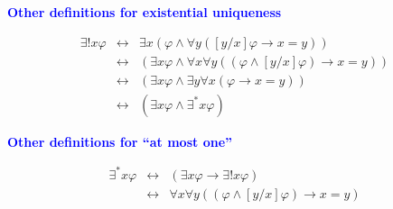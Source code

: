 \documentclass{slides}
\begin{document}
\begin{slide}

\begin{center}
\textcolor{blue}{\textbf{Other definitions
 for existential uniqueness}}
\end{center}
\begin{eqnarray}
  \exists{!} x \varphi
        & \leftrightarrow & \exists x ( \varphi \wedge
\forall y ( [ y / x ] \varphi \rightarrow x = y ) ) \label{eu1} \\
        & \leftrightarrow & ( \exists x \varphi \wedge
\forall x \forall y ( ( \varphi \wedge [ y / x ] \varphi ) \rightarrow x = y )
)  \label{eu2}  \\
        & \leftrightarrow & ( \exists x \varphi \wedge
\exists y \forall x ( \varphi \rightarrow x = y ) ) \label{eu3} \\
        & \leftrightarrow & ( \exists x \varphi \wedge
\exists^\ast x \varphi ) \label{eu5}
\end{eqnarray}

\begin{center}
\textcolor{blue}{\textbf{Other definitions for ``at most one''}}
\end{center}
\begin{eqnarray}
\exists^\ast x \varphi & \leftrightarrow & ( \exists x \varphi \rightarrow
\exists{!} x \varphi ) \label{df-mo} \\
        & \leftrightarrow & \forall x \forall y ( ( \varphi
\wedge [ y / x ] \varphi ) \rightarrow x = y )  \label{mo3}
\end{eqnarray}



\end{slide}
\end{document}
